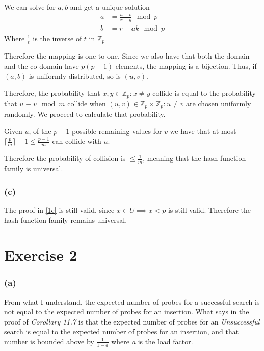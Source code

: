 \documentclass{article}
\begin{document}
We can solve for \(a, b\) and get a unique solution
\begin{align*}
    a &= \frac{u-v}{x-y} \mod{p}\\
    b &= r - ak \mod{p}
\end{align*}
Where \(\frac{1}{t}\) is the inverse of \(t\) in \(\mathbb{Z}_p\)

Therefore the mapping is one to one.
Since we also have that both the domain and the co-domain have
\(p(p-1)\) elements, the mapping is a bijection.
Thus, if \((a, b)\) is uniformly distributed, so is \((u, v)\).

Therefore, the probability that \(x, y \in \mathbb{Z}_p: x \neq y\) collide
is equal to the probability that \(u \equiv v \mod{m}\) collide
when \((u, v) \in \mathbb{Z}_p \times \mathbb{Z}_p: u \neq v\)
are chosen uniformly randomly.
We proceed to calculate that probability.

Given \(u\), of the \(p-1\) possible remaining values for \(v\) we have that
at most \(\lceil{\frac{p}{m}}\rceil - 1 \leq \frac{p-1}{m}\)
can collide with \(u\). 

Therefore the probability of collision is \(\leq \frac{1}{m}\),
meaning that the hash function family is universal.

\subsubsection*{(c)}\label{1c}

The proof in \ref{1c} is still valid,
since \(x \in U \implies x < p\) is still valid.
Therefore the hash function family remains universal.


\section*{Exercise 2}

\subsubsection*{(a)}

From what I understand,
the expected number of probes for a successful search is not equal to 
the expected number of probes for an insertion.
What \cite{clrs} says in the proof of \emph{Corollary 11.7} is that
the expected number of probes for an \emph{Unsuccessful} search is
equal to the expected number of probes for an insertion,
and that number is bounded above by \(\frac{1}{1-a}\)
where \(a\) is the load factor.
\end{document}
